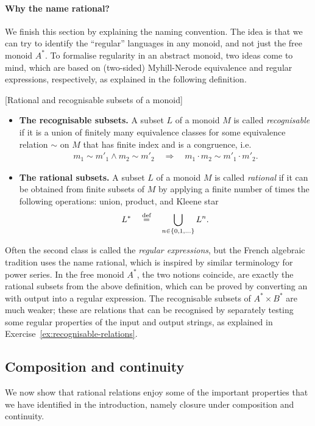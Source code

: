 \paragraph*{Why the name rational?} We finish this section by explaining the naming convention. The idea is that we can try to identify the ``regular'' languages in any monoid, and not just the free monoid $A^*$. To formalise regularity in an abstract monoid, two ideas come to mind, which are based on (two-sided) Myhill-Nerode equivalence and regular expressions, respectively, as explained in the following definition.
\begin{definition}\label{def:rational-recognisable-subsets}
    [Rational and recognisable subsets of a monoid] \ 
    \begin{itemize}
    \item \textbf{The recognisable subsets.} A subset $L$ of a monoid $M$  is called \emph{recognisable} if it is a union of finitely many equivalence classes for some equivalence relation $\sim$ on $M$ that has finite index and is a congruence, i.e.
    \begin{align*}
    m_1 \sim m'_1 \land m_2 \sim m'_2 \quad \Rightarrow \quad m_1 \cdot m_2 \sim m'_1 \cdot m'_2.
    \end{align*}
    \item \textbf{The rational subsets.} A subset $L$ of a monoid $M$ is called \emph{rational} if it can be obtained from finite subsets of $M$ by applying a finite number of times the following operations: union, product, and Kleene star
    \begin{align*}
    L^* \quad \stackrel{\text{def}}= \quad \bigcup_{n \in \{0,1,\ldots\}}L^n.
    \end{align*}
    \end{itemize}
\end{definition}
Often the second class is called the \emph{regular expressions}, but the French algebraic tradition uses the name rational, which is inspired by similar terminology for power series.
In the free monoid $A^*$, the two notions coincide, are exactly the rational subsets from the above definition, which can be proved by converting an \nfa with output into a regular expression. The recognisable subsets of $A^* \times B^*$ are much weaker; these are relations that can be recognised by separately testing some regular properties of the input and output strings, as explained in Exercise~\ref{ex:recognisable-relations}.


\subsection{Composition and continuity} We now show that rational relations enjoy some  of the important properties that we have identified in the introduction, namely closure under composition and continuity.



